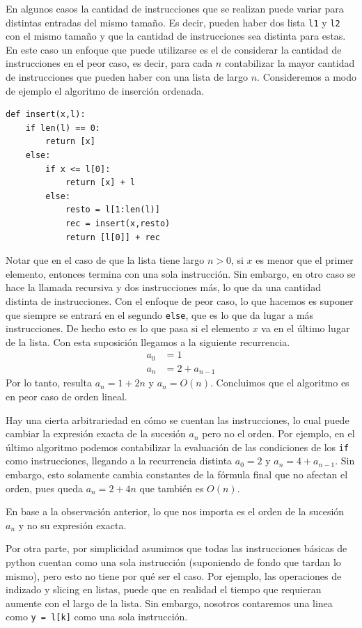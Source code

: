 \documentclass[a4paper, 12pt]{report}
\theoremstyle{definition}
\begin{document}
En algunos casos la cantidad de instrucciones que se realizan puede variar para distintas entradas del mismo tamaño. Es decir, pueden haber dos lista {\tt l1} y {\tt l2} con el mismo tamaño y que la cantidad de instrucciones sea distinta para estas. En este caso un enfoque que puede utilizarse es el de considerar la cantidad de instrucciones en el peor caso, es decir, para cada $n$ contabilizar la mayor cantidad de instrucciones que pueden haber con una lista de largo $n$. Consideremos a modo de ejemplo el algoritmo de inserción ordenada.
\begin{verbatim}
def insert(x,l):
    if len(l) == 0:
        return [x]
    else:
        if x <= l[0]:
            return [x] + l
        else:
            resto = l[1:len(l)]
            rec = insert(x,resto)
            return [l[0]] + rec
\end{verbatim}
Notar que en el caso de que la lista tiene largo $n>0$, si $x$ es menor que el primer elemento, entonces termina con una sola instrucción. Sin embargo, en otro caso se hace la llamada recursiva y dos instrucciones más, lo que da una cantidad distinta de instrucciones. Con el enfoque de peor caso, lo que hacemos es suponer que siempre se entrará en el segundo {\tt else}, que es lo que da lugar a más instrucciones. De hecho esto es lo que pasa si el elemento $x$ va en el último lugar de la lista. Con esta suposición llegamos a la siguiente recurrencia.
\begin{align*}
	a_0 &= 1\\
	a_n &= 2 + a_{n-1}
\end{align*}
Por lo tanto, resulta $a_n = 1 + 2n$ y $a_n = O(n)$. Concluimos que el algoritmo es en peor caso de orden lineal.

Hay una cierta arbitrariedad en cómo se cuentan las instrucciones, lo cual puede cambiar la expresión exacta de la sucesión $a_n$ pero no el orden.
Por ejemplo, en el último algoritmo podemos contabilizar la evaluación de las condiciones de los {\tt if} como instrucciones, llegando a la recurrencia distinta $a_0=2$ y $a_n = 4 + a_{n-1}$. Sin embargo, esto solamente cambia constantes de la fórmula final que no afectan el orden, pues queda $a_n = 2 + 4n$ que también es $O(n)$.

En base a la observación anterior, lo que nos importa es el orden de la sucesión $a_n$ y no su expresión exacta.

Por otra parte, por simplicidad asumimos que todas las instrucciones básicas de python cuentan como una sola instrucción (suponiendo de fondo que tardan lo mismo), pero esto no tiene por qué ser el caso. Por ejemplo, las operaciones de indizado y slicing en listas, puede que en realidad el tiempo que requieran aumente con el largo de la lista. Sin embargo, nosotros contaremos una linea como {\tt y = l[k]} como una sola instrucción.
\end{document}
